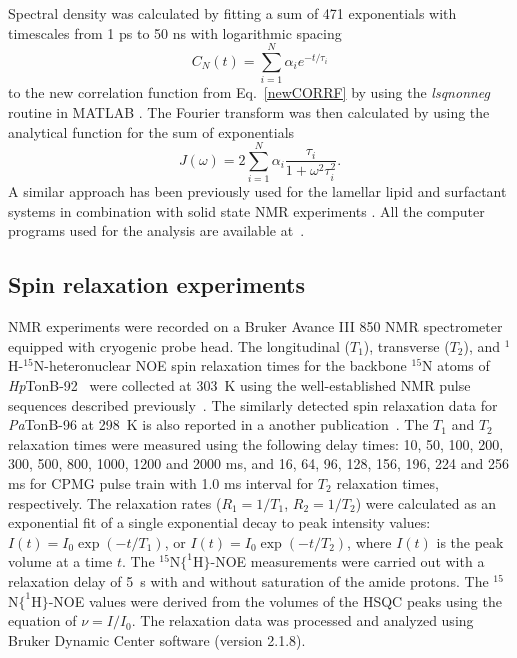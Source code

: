 \documentclass[journal=jpcbfk,manuscript=article]{achemso}
\begin{document}
Spectral density was calculated by fitting a
sum of 471 exponentials with timescales from 1 ps to 50 ns
with logarithmic spacing
\begin{equation}\label{gprime_fit}
C_N(t)=\sum_{i=1}^{N}\alpha_i e^{-t/\tau_i}
\end{equation}
to the new correlation function from Eq.~\ref{newCORRF}
by using the {\it lsqnonneg} routine in MATLAB \cite{matlab}.
The Fourier transform was then calculated by using the analytical function
for the sum of exponentials 
\begin{equation}\label{FTanal}
J(\omega) =  2 \sum_{i=1}^{N}\alpha_i\frac{\tau_i}{1+\omega^2\tau_i^2}.
\end{equation}
A similar approach has been previously used for the lamellar lipid and surfactant
systems in combination with solid state NMR experiments \cite{nowacka13,ferreira15}.
All the computer programs used for the analysis are available at~\cite{proteindynamicsGIT}.

\subsection{Spin relaxation experiments}
NMR experiments were recorded on a Bruker Avance III 850 NMR spectrometer equipped
with cryogenic probe head. The longitudinal ($T_1$), transverse ($T_2$), and
$^1$H-$^{15}$N-heteronuclear NOE spin relaxation times
for the backbone $^{15}$N atoms of {\it Hp}TonB-92~\cite{ciragan16}
were collected at 303~K using the well-established NMR pulse sequences described previously~\cite{kay89,barbato92}.
The similarly detected spin relaxation data for {\it Pa}TonB-96 at 298~K is also reported in a another publication~\cite{oeemig17}. 
The $T_1$ and $T_2$ relaxation times were measured using the following delay
times: 10, 50, 100, 200, 300, 500, 800, 1000, 1200 and 2000 ms,
and 16, 64, 96, 128, 156, 196, 224 and 256 ms for CPMG pulse train with 1.0 ms interval
for $T_2$ relaxation times, respectively. The relaxation rates ($R_1=1/T_1$, $R_2=1/T_2$)
were calculated as an exponential fit of a single exponential decay to peak intensity
values: $I(t) = I_0 \exp(-t/T_1)$, or $I(t)=I_0 \exp(-t/T_2)$,
where $I(t)$ is the peak volume at a time $t$. The $^{15}$N$ \{ ^1$H$ \} $-NOE measurements were carried out
with a relaxation delay of 5~s with and without saturation of the amide protons.
The $^{15}$N$ \{ ^1$H$ \} $-NOE values were derived from the volumes of the HSQC peaks using the
equation of $\nu=I/I_0$. The relaxation data was processed and analyzed using
Bruker Dynamic Center software (version 2.1.8).
\end{document}
